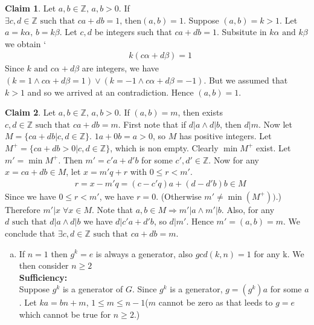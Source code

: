 \documentclass[A4paper,12pt]{article}
\theoremstyle{definition}
\newtheorem{claim}{Claim}
\numberwithin{equation}{section}
\begin{document}
\begin{enumerate}[1)]
        \begin{claim}
            Let $a, b \in \mathbb{Z},\, a,b>0$. If $\exists c,d\in \mathbb{Z} \text{ such that } ca+db=1,\, \text{then} (a,b)=1.$
            \proof
            Suppose $(a, b) = k>1$. Let $a = k\alpha,\, b = k\beta$. Let $c, d$ be integers such that $ca+db=1$. Subsitute in $k\alpha \text{ and } k\beta$ we obtain
    `        
            \begin{align*}
                &k(c\alpha+d\beta) = 1
            \end{align*}
            Since $k \text{ and }c\alpha+d\beta$ are integers, we have $(k=1 \land c\alpha+d\beta = 1) \lor (k = -1 \land c\alpha+d\beta = -1)$. But we assumed that $k>1$ and so we arrived at an contradiction.
            Hence $(a,b) = 1$.
        \end{claim}
        \begin{claim}
            Let $a, b \in \mathbb{Z},\, a,b>0$. If $(a,b)=m$, then exists $c, d \in \mathbb{Z} \text{ such that } ca+db = m$.
            \proof
            First note that if $d|a \land d|b$, then $d|m$. Now let $M = \{ca+db|c, d \in \mathbb{Z}\}$. $1a+0b = a > 0$, so $M$ has positive integers. Let $M^{+} = \{ca+db>0|c, d \in \mathbb{Z}\}$, which is non empty. Clearly $\min{M^{+}}$ exist. Let $m' = \min{M^{+}}$. Then $m' = c'a+d'b$ for some $c', d' \in \mathbb{Z}$. Now for any $x = ca+db \in M$, let $x = m'q+r$ with $0 \leq r <m'$.
        \begin{align*}
            &r = x-m'q = (c-c'q)a + (d-d'b)b \in M
        \end{align*}
        Since we have $0 \leq r < m'$, we have $r=0$. (Otherwise $m' \neq \min(M^{+}))$.)
        Therefore $m'|x \; \forall x \in M$. Note that $a, b\in M \Rightarrow m'|a \land m'|b$. Also, for any $d \text{ such that } d|a \land d|b$ we have $d|c'a+d'b$, so $d|m'$. Hence $m' = (a,b) = m$.
        We conclude that $\exists c, d \in \mathbb{Z} \text{ such that } ca+db = m$.
        \end{claim}
        \begin{enumerate}[(a)]
            \item
                If $n=1$ then $g^k = e$ is always a generator, also $gcd(k, n) = 1$ for any k.
                We then consider $n\ge 2$\\
                \textbf{Sufficiency:}\\
                Suppose $g^k$ is a generator of $G$. Since $g^k$ is a generator, $g = (g^k)a$ for some $a$. 
                Let $ka = bn + m$, $1 \le m \le n-1$($m$ cannot be zero as that leeds to $g = e$ which cannot be true for $n \ge 2$.)

\end{enumerate}
\end{enumerate}
\end{document}
